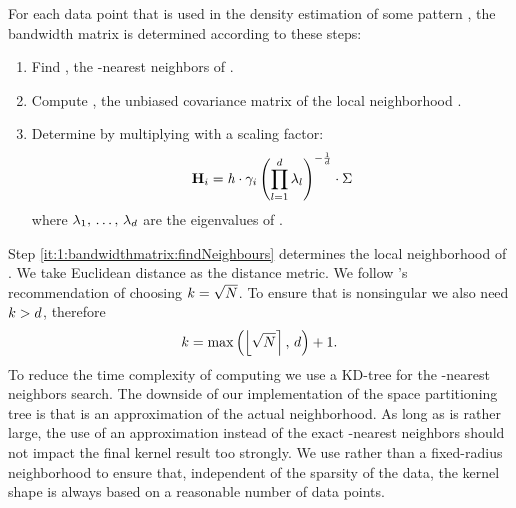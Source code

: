 	For each data point \varPattern[\itXis] that is used in the density estimation of some pattern \varPattern[\itXs], the bandwidth matrix is determined according to these steps:
		\begin{enumerate}[labelindent=0ex]
			\item \label{it:1:bandwidthmatrix:findNeighbours}
				Find \varNeighborhood{\varPattern[\itXis]}, the \KNNK-nearest neighbors of \varPattern[\itXis].
			\item \label{it:1:bandwidthmatrix:initialBandwidthMatrix}
				Compute \varCovarianceMatrix, the unbiased covariance matrix of the local neighborhood \varNeighborhood{\varPattern[\itXis]}.
			\item \label{it:1:bandwidthmatrix:scaleBandwidhtMatrix}
				Determine \varBandwidthMatrix[\itXis] by multiplying \varCovarianceMatrix with a scaling factor:
				\begin{equation}\label{eq:method:scalingFactor}
					\varBandwidthMatrix[\itXis] = \varBandwidth \cdot \varLocalBandwidth{\itXis} 
				 \left( \displaystyle\prod_{\itDim = 1}^{\varDim} \varEigenValue_\itDim \right)^{-\frac{1}{\varDim}} \cdot \varCovarianceMatrix
				\end{equation}
				where $\lambda_1,\, \dotsc,\, \lambda_d$ are the eigenvalues of \varCovarianceMatrix.  
		\end{enumerate}	
		Step \ref{it:1:bandwidthmatrix:findNeighbours} determines the local neighborhood of \varPattern[\itXis]. We take Euclidean distance as the distance metric. 
		We follow \citeauthor{silverman1986density}'s \cite{silverman1986density} recommendation of choosing $k = \sqrt{N}$. To ensure that \varCovarianceMatrix is nonsingular we also need $k > d$, therefore
		\begin{equation}\label{eq:method:k}
			k = \max\left(\left\lfloor \sqrt{N} \right\rceil,\, d \right) + 1.	
		\end{equation}			
		To reduce the time complexity of computing \varBandwidthMatrix[\itXis]we use a KD-tree for the \KNNK-nearest neighbors search\cite{Bentley1975Multidimensional}. The downside of our implementation of the space partitioning tree is that \varNeighborhood{\varPattern[\itXis]} is an approximation of the actual neighborhood. As long as \KNNK is rather large, the use of an approximation instead of the exact \KNNK-nearest neighbors should not impact the final kernel result too strongly. 
		We use \KNN rather than a fixed-radius neighborhood to ensure that, independent of the sparsity of the data, the kernel shape is always based on a reasonable number of data points. 

